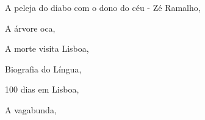 \begin{multicols}{2}
\begin{enumerate}
{\item A peleja do diabo com o dono do céu - Zé Ramalho, {}
\item A árvore oca, {}
\item A morte visita Lisboa, {}
\item Biografia do Língua, {}
\item 100 dias em Lisboa, {}
\item A vagabunda, {}
}
\end{enumerate}
\end{multicols}

\pagebreak

%
%
%
%
%
%
